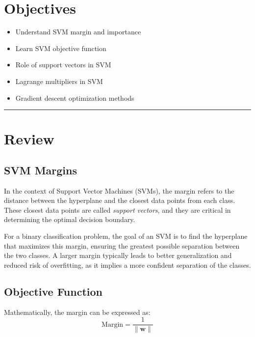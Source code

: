 \section*{Objectives}
\begin{itemize}
    \item Understand SVM margin and importance
    \item Learn SVM objective function
    \item Role of support vectors in SVM
    \item Lagrange multipliers in SVM
    \item Gradient descent optimization methods
\end{itemize}


\rule[0.0051in]{\textwidth}{0.00025in}

\section{Review}
\subsection{SVM Margins}

In the context of Support Vector Machines (SVMs), the margin refers to the distance between the hyperplane and the closest data points from each class. These closest data points are called \textit{support vectors}, and they are critical in determining the optimal decision boundary.

For a binary classification problem, the goal of an SVM is to find the hyperplane that maximizes this margin, ensuring the greatest possible separation between the two classes. A larger margin typically leads to better generalization and reduced risk of overfitting, as it implies a more confident separation of the classes.

\subsection{Objective Function}

Mathematically, the margin can be expressed as:
\[
\text{Margin} = \frac{1}{\| \mathbf{w} \|}
\]

